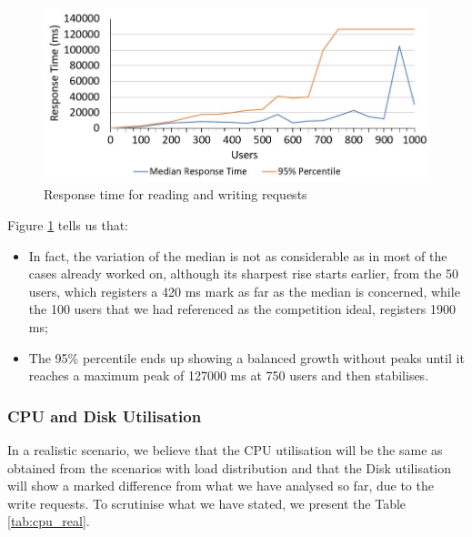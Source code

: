   \begin{figure}[H]
    \centering
    \includegraphics[width=1\textwidth]{img/performance_evaluation/real_time.JPG}
    \caption{\label{tab:time_real}Response time for reading and writing requests}
  \end{figure}
  
  Figure \ref{tab:time_real} tells us that:
  
  \begin{itemize}
      \item In fact, the variation of the median is not as considerable as in most of the cases already worked on, although its sharpest rise starts earlier, from the 50 users, which registers a 420 ms mark as far as the median is concerned, while the 100 users that we had referenced as the competition ideal, registers 1900 ms;
      \item The 95\% percentile ends up showing a balanced growth without peaks until it reaches a maximum peak of 127000 ms at 750 users and then stabilises.
  \end{itemize}
  
\newpage  
  
  \subsubsection{CPU and Disk Utilisation}
  
  In a realistic scenario, we believe that the CPU utilisation will be the same as obtained from the scenarios with load distribution and that the Disk utilisation will show a marked difference from what we have analysed so far, due to the write requests. To scrutinise what we have stated, we present the Table \ref{tab:cpu_real}.


